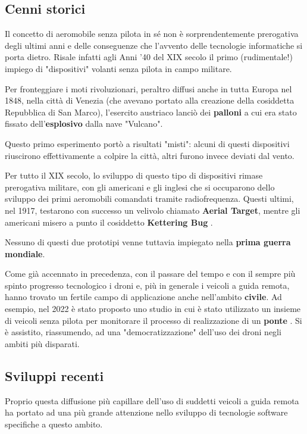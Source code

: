 \documentclass[a4paper, 12pt, oneside]{article}
\begin{document}
\subsection{Cenni storici}
Il concetto di aeromobile senza pilota in sé non è sorprendentemente prerogativa degli ultimi anni e delle conseguenze che l'avvento delle tecnologie informatiche si porta dietro. Risale infatti agli Anni '40 del XIX secolo il primo (rudimentale!) impiego di "dispositivi" volanti senza pilota in campo militare. 

Per fronteggiare i moti rivoluzionari, peraltro diffusi anche in tutta Europa nel 1848, nella città di Venezia (che avevano portato alla creazione della cosiddetta Repubblica di San Marco), l'esercito austriaco lanciò dei \textbf{palloni} a cui era stato fissato dell'\textbf{esplosivo} dalla nave "Vulcano". 

Questo primo esperimento portò a risultati "misti": alcuni di questi dispositivi riuscirono effettivamente a colpire la città, altri furono invece deviati dal vento.

Per tutto il XIX secolo, lo sviluppo di questo tipo di dispositivi rimase prerogativa militare, con gli americani e gli inglesi che si occuparono dello sviluppo dei primi aeromobili comandati tramite radiofrequenza. Questi ultimi, nel 1917, testarono con successo un velivolo chiamato \textbf{Aerial Target}, mentre gli americani misero a punto il cosiddetto \textbf{Kettering Bug} \cite{drones-history}.

Nessuno di questi due prototipi venne tuttavia impiegato nella \textbf{prima guerra mondiale}.

Come già accennato in precedenza, con il passare del tempo e con il sempre più spinto progresso tecnologico i droni e, più in generale i veicoli a guida remota, hanno trovato un fertile campo di applicazione anche nell'ambito \textbf{civile}. Ad esempio, nel 2022 è stato proposto uno studio in cui è stato utilizzato un insieme di veicoli senza pilota per monitorare il processo di realizzazione di un \textbf{ponte} \cite{rs14081858}.
Si è assistito, riassumendo, ad una "democratizzazione" dell'uso dei droni negli ambiti più disparati.

\subsection{Sviluppi recenti}
Proprio questa diffusione più capillare dell'uso di suddetti veicoli a guida remota ha portato ad una più grande attenzione nello sviluppo di tecnologie software specifiche a questo ambito. 
\end{document}
